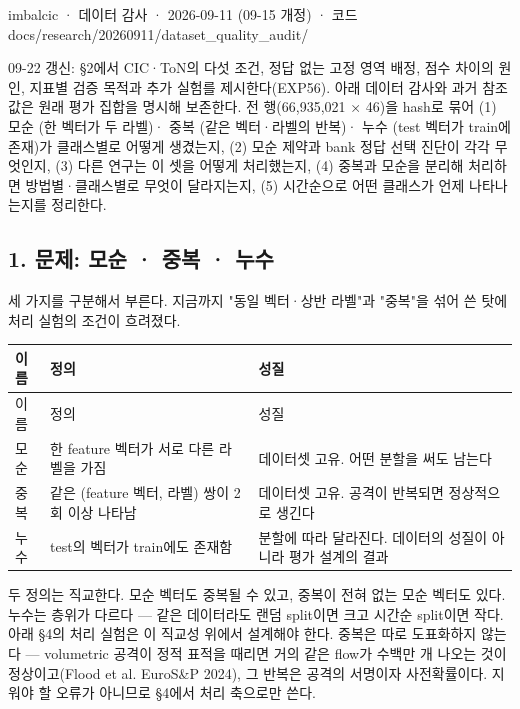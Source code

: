 imbalcic · 데이터 감사 · 2026-09-11 (09-15 개정) · 코드 docs/\allowbreak{}research/\allowbreak{}20260911/\allowbreak{}dataset\_\allowbreak{}quality\_\allowbreak{}audit/\allowbreak{}

09-22 갱신: §2에서 CIC·ToN의 다섯 조건, 정답 없는 고정 영역 배정, 점수 차이의 원인, 지표별 검증 목적과 추가 실험를 제시한다(EXP56). 아래 데이터 감사와 과거 참조값은 원래 평가 집합을 명시해 보존한다. 전 행(66,935,021 × 46)을 hash로 묶어 (1) 모순 (한 벡터가 두 라벨)· 중복 (같은 벡터·라벨의 반복)· 누수 (test 벡터가 train에 존재)가 클래스별로 어떻게 생겼는지, (2) 모순 제약과 bank 정답 선택 진단이 각각 무엇인지, (3) 다른 연구는 이 셋을 어떻게 처리했는지, (4) 중복과 모순을 분리해 처리하면 방법별·클래스별로 무엇이 달라지는지, (5) 시간순으로 어떤 클래스가 언제 나타나는지를 정리한다.

\subsection*{1. 문제: 모순 · 중복 · 누수}
세 가지를 구분해서 부른다. 지금까지 "동일 벡터·상반 라벨"과 "중복"을 섞어 쓴 탓에 처리 실험의 조건이 흐려졌다.

\begingroup
\footnotesize
\begin{longtable}{>{\raggedright\arraybackslash}p{}>{\raggedright\arraybackslash}p{}>{\raggedright\arraybackslash}p{}}
\toprule
이름 & 정의 & 성질 \\ \midrule
\endfirsthead
이름 & 정의 & 성질 \\ \midrule
\endhead
{}모순 & 한 feature 벡터가 서로 다른 라벨을 가짐 & 데이터셋 고유. 어떤 분할을 써도 남는다 \\
{}중복 & 같은 (feature 벡터, 라벨) 쌍이 2회 이상 나타남 & 데이터셋 고유. 공격이 반복되면 정상적으로 생긴다 \\
{}누수 & test의 벡터가 train에도 존재함 & 분할에 따라 달라진다. 데이터의 성질이 아니라 평가 설계의 결과 \\
\bottomrule
\end{longtable}
\endgroup
두 정의는 직교한다. 모순 벡터도 중복될 수 있고, 중복이 전혀 없는 모순 벡터도 있다. 누수는 층위가 다르다 — 같은 데이터라도 랜덤 split이면 크고 시간순 split이면 작다. 아래 §4의 처리 실험은 이 직교성 위에서 설계해야 한다. 중복은 따로 도표화하지 않는다 — volumetric 공격이 정적 표적을 때리면 거의 같은 flow가 수백만 개 나오는 것이 정상이고(Flood et al. EuroS\&P 2024), 그 반복은 공격의 서명이자 사전확률이다. 지워야 할 오류가 아니므로 §4에서 처리 축으로만 쓴다.

